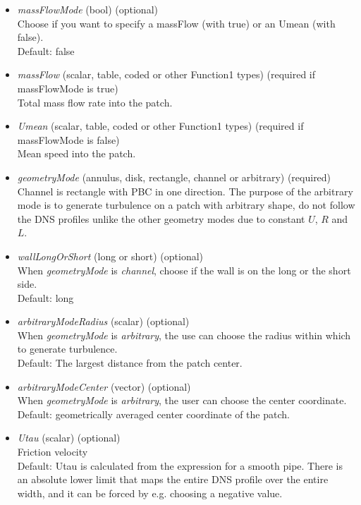 \begin{itemize}
  \item \textit{massFlowMode} (bool) (optional)\\
    Choose if you want to specify a massFlow (with true) or an Umean (with false).\\
    Default: false

  \item \textit{massFlow} (scalar, table, coded or other Function1 types) (required if massFlowMode is true)\\
    Total mass flow rate into the patch.

  \item \textit{Umean} (scalar, table, coded or other Function1 types) (required if massFlowMode is false)\\
    Mean speed into the patch.

  \item \textit{geometryMode} (annulus, disk, rectangle, channel or arbitrary) (required)\\
    Channel is rectangle with PBC in one direction. The purpose of the arbitrary mode is to generate turbulence on a patch with arbitrary shape, do not follow the DNS profiles unlike the other geometry modes due to constant $U$, $R$ and $L$.

  \item \textit{wallLongOrShort} (long or short) (optional)\\
    When \textit{geometryMode} is \textit{channel}, choose if the wall is on the long or the short side.\\
    Default: long

  \item \textit{arbitraryModeRadius} (scalar) (optional)\\
    When \textit{geometryMode} is \textit{arbitrary}, the use can choose the radius within which to generate turbulence.\\
    Default: The largest distance from the patch center.

  \item \textit{arbitraryModeCenter} (vector) (optional)\\
    When \textit{geometryMode} is \textit{arbitrary}, the user can choose the center coordinate.\\
    Default: geometrically averaged center coordinate of the patch.

  \item \textit{Utau} (scalar) (optional)\\
    Friction velocity\\
    Default: Utau is calculated from the expression for a smooth pipe. There is an absolute lower limit that maps the entire DNS profile over the entire width, and it can be forced by e.g. choosing a negative value.


\end{itemize}
